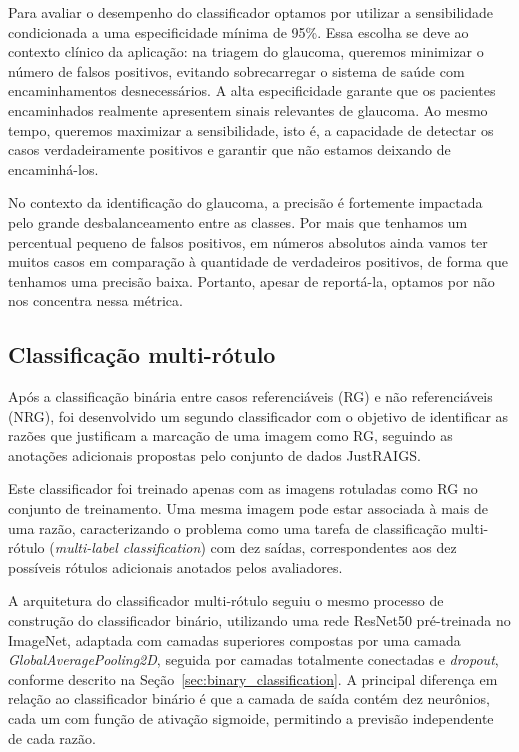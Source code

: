 \documentclass[12pt]{article}
\begin{document}
Para avaliar o desempenho do classificador optamos por utilizar a sensibilidade condicionada a uma especificidade mínima de 95\%. Essa escolha se deve ao contexto clínico da aplicação: na triagem do glaucoma, queremos minimizar o número de falsos positivos, evitando sobrecarregar o sistema de saúde com encaminhamentos desnecessários. A alta especificidade garante que os pacientes encaminhados realmente apresentem sinais relevantes de glaucoma. Ao mesmo tempo, queremos maximizar a sensibilidade, isto é, a capacidade de detectar os casos verdadeiramente positivos e garantir que não estamos deixando de encaminhá-los.

No contexto da identificação do glaucoma, a precisão é fortemente impactada pelo grande desbalanceamento entre as classes. Por mais que tenhamos um percentual pequeno de falsos positivos, em números absolutos ainda vamos ter muitos casos em comparação à quantidade de verdadeiros positivos, de forma que tenhamos uma precisão baixa. Portanto, apesar de reportá-la, optamos por não nos concentra nessa métrica.




\subsection{Classificação multi-rótulo}
\label{sec:multi_classification}

Após a classificação binária entre casos referenciáveis (RG) e não referenciáveis (NRG), foi desenvolvido um segundo classificador com o objetivo de identificar as razões que justificam a marcação de uma imagem como RG, seguindo as anotações adicionais propostas pelo conjunto de dados JustRAIGS.

Este classificador foi treinado apenas com as imagens rotuladas como RG no conjunto de treinamento. Uma mesma imagem pode estar associada à mais de uma razão, caracterizando o problema como uma tarefa de classificação multi-rótulo (\emph{multi-label classification}) com dez saídas, correspondentes aos dez possíveis rótulos adicionais anotados pelos avaliadores.

A arquitetura do classificador multi-rótulo seguiu o mesmo processo de construção do classificador binário, utilizando uma rede ResNet50 pré-treinada no ImageNet, adaptada com camadas superiores compostas por uma camada \emph{GlobalAveragePooling2D}, seguida por camadas totalmente conectadas e \emph{dropout}, conforme descrito na Seção~\ref{sec:binary_classification}. A principal diferença em relação ao classificador binário é que a camada de saída contém dez neurônios, cada um com função de ativação sigmoide, permitindo a previsão independente de cada razão.
\end{document}
